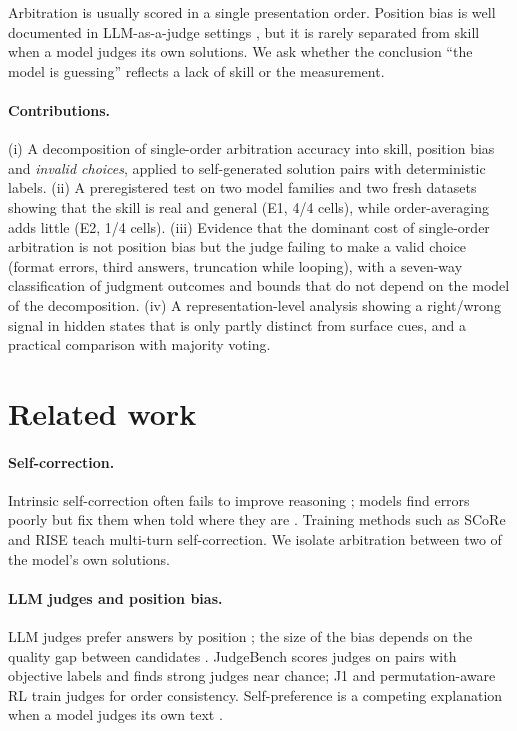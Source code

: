 \documentclass[11pt]{article}
\begin{document}
Arbitration is usually scored in a single presentation order. Position bias is well documented in
LLM-as-a-judge settings \citep{zheng2023judging,wang2024fair,shi2024judging}, but it is rarely separated from
skill when a model judges its own solutions. We ask whether the conclusion ``the model is guessing'' reflects a
lack of skill or the measurement.

\paragraph{Contributions.}
(i) A decomposition of single-order arbitration accuracy into skill, position bias and \emph{invalid choices},
applied to self-generated solution pairs with deterministic labels.
(ii) A preregistered test on two model families and two fresh datasets showing that the skill is real and
general (E1, 4/4 cells), while order-averaging adds little (E2, 1/4 cells).
(iii) Evidence that the dominant cost of single-order arbitration is not position bias but the judge failing
to make a valid choice (format errors, third answers, truncation while looping), with a seven-way
classification of judgment outcomes and bounds that do not depend on the model of the decomposition.
(iv) A representation-level analysis showing a right/wrong signal in hidden states that is only partly
distinct from surface cues, and a practical comparison with majority voting.

\section{Related work}
\paragraph{Self-correction.} Intrinsic self-correction often fails to improve reasoning
\citep{huang2023cannot}; models find errors poorly but fix them when told where they are \citep{tyen2024find}.
Training methods such as SCoRe \citep{kumar2025score} and RISE \citep{qu2024rise} teach multi-turn
self-correction. We isolate arbitration between two of the model's own solutions.
\paragraph{LLM judges and position bias.} LLM judges prefer answers by position
\citep{zheng2023judging,wang2024fair}; the size of the bias depends on the quality gap between candidates
\citep{shi2024judging}. JudgeBench \citep{tan2025judgebench} scores judges on pairs with objective labels and
finds strong judges near chance; J1 \citep{whitehouse2026j1} and permutation-aware RL
\citep{pagrpo2026} train judges for order consistency. Self-preference is a competing explanation when a model
judges its own text \citep{panickssery2024recognize}.
\end{document}

